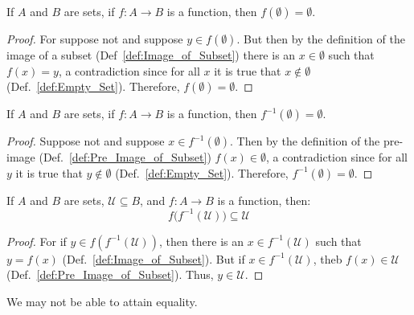     \begin{theorem}
        \label{thm:Image_of_Empty_Set_Is_Empty}%
        If $A$ and $B$ are sets, if $f:A\rightarrow{B}$ is a function,
        then $f(\emptyset)=\emptyset$.
    \end{theorem}
    \begin{proof}
        For suppose not and suppose $y\in{f}(\emptyset)$. But then by the
        definition of the image of a subset (Def~\ref{def:Image_of_Subset})
        there is an $x\in\emptyset$ such that $f(x)=y$, a contradiction since
        for all $x$ it is true that $x\notin\emptyset$
        (Def.~\ref{def:Empty_Set}). Therefore, $f(\emptyset)=\emptyset$.
    \end{proof}
    \begin{theorem}
        \label{thm:Pre_Image_of_Empty_Set_Is_Empty}%
        If $A$ and $B$ are sets, if $f:A\rightarrow{B}$ is a function, then
        $f^{\minus{1}}(\emptyset)=\emptyset$.
    \end{theorem}
    \begin{proof}
        Suppose not and suppose $x\in{f}^{\minus{1}}(\emptyset)$. Then by the
        definition of the pre-image (Def.~\ref{def:Pre_Image_of_Subset})
        $f(x)\in\emptyset$, a contradiction since for all $y$ it is true that
        $y\notin\emptyset$ (Def.~\ref{def:Empty_Set}). Therefore,
        $f^{\minus{1}}(\emptyset)=\emptyset$.
    \end{proof}
    \begin{theorem}
        \label{thm:Image_of_PreImage_is_Subset}%
        If $A$ and $B$ are sets, $\mathcal{U}\subseteq{B}$, and
        $f:A\rightarrow{B}$ is a function, then:
        \begin{equation*}
            f\big(f^{\minus{1}}(\mathcal{U})\big)\subseteq\mathcal{U}
        \end{equation*}
    \end{theorem}
    \begin{proof}
        For if $y\in{f(f^{\minus{1}}(\mathcal{U}))}$, then there is an
        $x\in{f^{\minus{1}}(\mathcal{U})}$ such that $y=f(x)$
        (Def.~\ref{def:Image_of_Subset}). But if
        $x\in{f^{\minus{1}}(\mathcal{U})}$, theb $f(x)\in\mathcal{U}$
        (Def.~\ref{def:Pre_Image_of_Subset}). Thus, $y\in\mathcal{U}$.
    \end{proof}
    We may not be able to attain equality.
